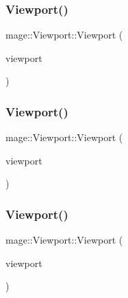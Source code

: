 \subsubsection{\texorpdfstring{Viewport()}{Viewport()}\hspace{0.1cm}{\footnotesize\ttfamily [2/5]}}
{\footnotesize\ttfamily mage\+::\+Viewport\+::\+Viewport (\begin{DoxyParamCaption}\item[{const D3\+D11\+\_\+\+V\+I\+E\+W\+P\+O\+RT \&}]{viewport }\end{DoxyParamCaption})\hspace{0.3cm}{\ttfamily [explicit]}}

\hypertarget{structmage_1_1_viewport_a44d0f073e593ce4db5c88fad276ffbcf}{}\label{structmage_1_1_viewport_a44d0f073e593ce4db5c88fad276ffbcf} 
\subsubsection{\texorpdfstring{Viewport()}{Viewport()}\hspace{0.1cm}{\footnotesize\ttfamily [3/5]}}
{\footnotesize\ttfamily mage\+::\+Viewport\+::\+Viewport (\begin{DoxyParamCaption}\item[{D3\+D11\+\_\+\+V\+I\+E\+W\+P\+O\+RT \&\&}]{viewport }\end{DoxyParamCaption})\hspace{0.3cm}{\ttfamily [explicit]}}

\hypertarget{structmage_1_1_viewport_ae94d36685270b07e64730aa4eaad8d66}{}\label{structmage_1_1_viewport_ae94d36685270b07e64730aa4eaad8d66} 
\subsubsection{\texorpdfstring{Viewport()}{Viewport()}\hspace{0.1cm}{\footnotesize\ttfamily [4/5]}}
{\footnotesize\ttfamily mage\+::\+Viewport\+::\+Viewport (\begin{DoxyParamCaption}\item[{const \hyperlink{structmage_1_1_viewport}{Viewport} \&}]{viewport }\end{DoxyParamCaption})\hspace{0.3cm}{\ttfamily [default]}}

